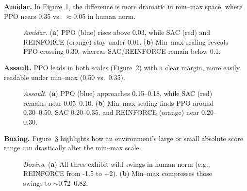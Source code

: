\noindent \textbf{Amidar.} In Figure~\ref{fig:amidar_combined}, the difference is more dramatic in min--max space, where PPO nears 0.35 vs.\ $\approx$\num{0.05} in human norm.
\begin{figure} 
	\centering
	\quad
	\caption{\emph{Amidar.}
		(\textbf{a}) PPO (blue) rises above 0.03, while SAC (red) and REINFORCE (orange) stay under 0.01. 
		(\textbf{b}) Min--max scaling reveals PPO crossing 0.30, whereas SAC/REINFORCE remain below 0.1.}
	\label{fig:amidar_combined}
\end{figure}

\medskip

\noindent \textbf{Assault.} PPO leads in both scales (Figure~\ref{fig:assault_combined}) with a clear margin, more easily readable under min--max (0.50 vs.\ 0.35).
\begin{figure} 
	\centering
	\quad
	\caption{\emph{Assault.}
		(\textbf{a}) PPO (blue) approaches 0.15--0.18, while SAC (red) remains near 0.05--0.10.
		(\textbf{b}) Min--max scaling finds PPO around 0.30--0.50, SAC 0.20--0.35, and REINFORCE (orange) near 0.20--0.30.}
	\label{fig:assault_combined}
\end{figure}

\medskip

\noindent \textbf{Boxing.} Figure~\ref{fig:boxing_combined} highlights how an environment's large or small absolute score range can drastically alter the min--max scale.
\begin{figure} 
	\centering
	\quad
	\caption{\emph{Boxing.}
		(\textbf{a}) All three exhibit wild swings in human norm (e.g., REINFORCE from -1.5 to +2).
		(\textbf{b}) Min--max compresses those swings to $\sim$\num{0.72}--\num{0.82}.}
	\label{fig:boxing_combined}
\end{figure}


